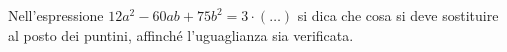 Nell'espressione $12a^2 - 60 ab + 75 b^2 = 3 \cdot (\dots)$
si dica che cosa si deve sostituire al posto dei puntini, 
affinché l'uguaglianza sia verificata.
